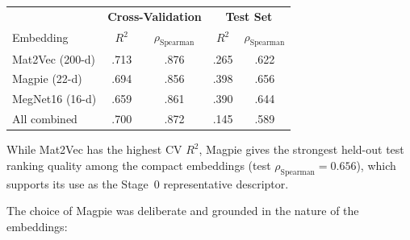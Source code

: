 \documentclass[11pt,a4paper]{article}
\newcommand{\Rtwo}{R^{2}}
\newcommand{\rhoS}{\rho_{\text{Spearman}}}
\begin{document}
\begin{center}
      \small
      \begin{tabular}{lcc|cc}
            \toprule
                            & \multicolumn{2}{c|}{\textbf{Cross-Validation}} & \multicolumn{2}{c}{\textbf{Test Set}}                     \\
            Embedding       & $\Rtwo$                                        & $\rhoS$                               & $\Rtwo$ & $\rhoS$ \\
            \midrule
            Mat2Vec (200-d) & .713                                           & .876                                  & .265    & .622    \\
            Magpie (22-d)   & .694                                           & .856                                  & .398    & .656    \\
            MegNet16 (16-d) & .659                                           & .861                                  & .390    & .644    \\
            All combined    & .700                                           & .872                                  & .145    & .589    \\
            \bottomrule
      \end{tabular}
\end{center}

While Mat2Vec has the highest CV $\Rtwo$, Magpie gives the strongest held-out
test ranking quality among the compact embeddings (test $\rhoS = 0.656$),
which supports its use as the Stage~0 representative descriptor.

The choice of Magpie was deliberate and grounded in the nature of the
embeddings:
\end{document}
